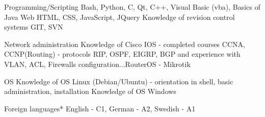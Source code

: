 \begin{cvskills}

  \vspace{5pt}
  
  \cvskill
    {Programming/Scripting} %
    {Bash, Python, C, Qt, C++, Visual Basic (vba), Basics of Java} %
  \vspace{5pt}
  \cvskill
    {Web} %
    {HTML, CSS, JavaScript, JQuery \newline Knowledge of revision control systems GIT, SVN}

  \vspace{5pt}
    
  \cvskill
    {Network administration} %
    {Knowledge of Cisco IOS - completed courses CCNA, CCNP(Routing) - protocols RIP, OSPF, EIGRP, BGP and \newline experience with VLAN, ACL, Firewalls configuration...\newline RouterOS - Mikrotik} %
  
  \vspace{5pt}
  \cvskill
    {OS}
    {Knowledge of OS Linux (Debian/Ubuntu) - orientation in shell, basic administration, installation \newline Knowledge of OS Windows}
  \vspace{5pt}
    
  \cvskill
    {Foreign languages*} %
    {English - C1, German - A2, Swedish - A1} %

\end{cvskills}
